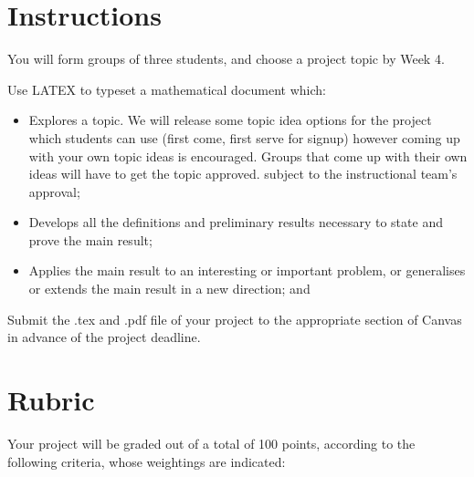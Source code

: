 \documentclass{article}
\begin{document}
\section*{Instructions}
    You will form groups of three students, and choose a project topic by Week 4. 
    
    Use LATEX to typeset a mathematical document which:
    \begin{itemize}
        \item Explores a topic. We will release some topic idea options for the project which students can use (first come, first serve for signup) however coming up with your own topic ideas is encouraged. Groups that come up with their own ideas will have to get the topic approved. subject to the instructional team's approval;
        \item Develops all the definitions and preliminary results necessary to state and prove the main result;
        \item Applies the main result to an interesting or important problem, or generalises or extends the main result in a new direction; and
    \end{itemize}
    Submit the .tex and .pdf file of your project to the appropriate section of Canvas in advance of the project deadline.

\pagebreak 

\section*{Rubric}
Your project will be graded out of a total of 100 points, according to the following criteria, whose weightings are indicated:
\end{document}
